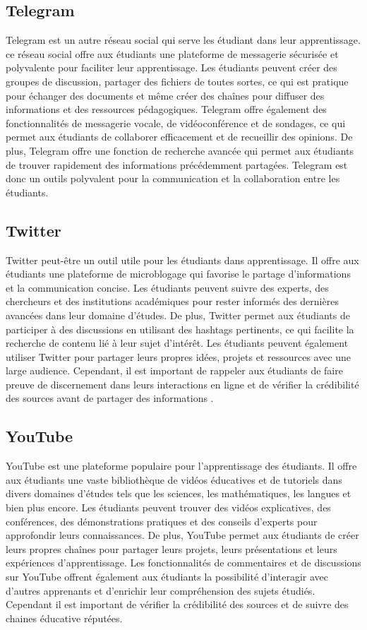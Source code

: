 \documentclass[12pt,a4paper,titlepage]{article}
\begin{document}
\subsection{Telegram}
Telegram est un autre réseau social qui serve les étudiant dans leur apprentissage. ce réseau social offre aux étudiants une plateforme de messagerie sécurisée et polyvalente pour faciliter leur apprentissage. Les étudiants peuvent créer des groupes de discussion, partager des fichiers de toutes sortes, ce qui est pratique pour échanger des documents  et même créer des chaînes pour diffuser des informations et des ressources pédagogiques. Telegram offre également des fonctionnalités de messagerie vocale, de vidéoconférence et de sondages, ce qui permet aux étudiants de collaborer efficacement et de recueillir des opinions. De plus, Telegram offre une fonction de recherche avancée qui permet aux étudiants de trouver rapidement des informations précédemment partagées. Telegram est donc un outils polyvalent pour la communication et la collaboration entre les étudiants.
\subsection{Twitter }
Twitter peut-être un outil utile pour les étudiants dans apprentissage. Il offre aux étudiants une plateforme de microblogage qui favorise le partage d'informations et la communication concise. Les étudiants peuvent suivre des experts, des chercheurs et des institutions académiques pour rester informés des dernières avancées dans leur domaine d'études. De plus, Twitter permet aux étudiants de participer à des discussions en utilisant des hashtags pertinents, ce qui facilite la recherche de contenu lié à leur sujet d'intérêt. Les étudiants peuvent également utiliser Twitter pour partager leurs propres idées, projets et ressources avec une large audience. Cependant, il est important de rappeler aux étudiants de faire preuve de discernement dans leurs interactions en ligne et de vérifier la crédibilité des sources avant de partager des informations .
\subsection{YouTube}
YouTube est une plateforme populaire pour l’apprentissage des étudiants. Il offre aux étudiants une vaste bibliothèque de vidéos éducatives et de tutoriels dans divers domaines d'études tels que les sciences, les mathématiques, les langues et bien plus encore. Les étudiants peuvent trouver des vidéos explicatives, des conférences, des démonstrations pratiques et des conseils d'experts pour approfondir leurs connaissances. De plus, YouTube permet aux étudiants de créer leurs propres chaînes pour partager leurs projets, leurs présentations et leurs expériences d'apprentissage. Les fonctionnalités de commentaires et de discussions sur YouTube offrent également aux étudiants la possibilité d'interagir avec d'autres apprenants et d'enrichir leur compréhension des sujets étudiés. Cependant il est important de vérifier la crédibilité des sources et de suivre des chaines éducative réputées.
\end{document}
